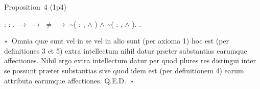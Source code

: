 \documentclass[12pt]{report}
\begin{document}
Proposition 4 (1p4) \begin{coqdoccode}
\coqdocindent{1.00em}
 :\coqdoceol
\coqdocindent{2.00em}
\coqdockw{\ensuremath{\forall}}  : , \coqdoceol
\coqdocindent{3.00em}
  \ensuremath{\rightarrow} \coqdoceol
\coqdocindent{3.00em}
  \ensuremath{\rightarrow} \coqdoceol
\coqdocindent{3.00em}
 \ensuremath{\not=}  \ensuremath{\rightarrow}\coqdoceol
\coqdocindent{3.00em}
\~{}(\coqdoctac{\ensuremath{\exists}} : , \coqdoceol
\coqdocindent{5.00em}
   \ensuremath{\land}   )\coqdoceol
\coqdocindent{3.00em}
\ensuremath{\land}\coqdoceol
\coqdocindent{3.00em}
\~{}(\coqdoctac{\ensuremath{\exists}} : , \coqdoceol
\coqdocindent{5.00em}
   \ensuremath{\land}   ).\coqdoceol
\coqdocemptyline
\coqdocemptyline
\coqdocindent{1.00em}
.\coqdoceol
\end{coqdoccode}
« Omnia quæ sunt vel in se vel in alio sunt (per axioma 1) hoc
    est (per definitiones 3 et 5) extra intellectum nihil datur præter
    substantias earumque affectiones. Nihil ergo extra intellectum datur
    per quod plures res distingui inter se possunt præter substantias
    sive quod idem est (per definitionem 4) earum attributa earumque
    affectiones. Q.E.D. » 
\end{document}
